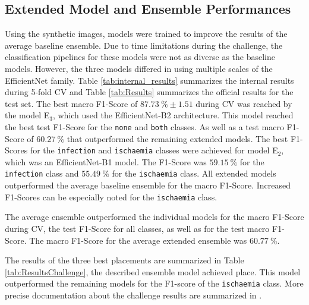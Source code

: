 \documentclass[runningheads]{llncs}
\begin{document}

\subsection{Extended Model and Ensemble Performances}%

Using the synthetic images, models were trained to improve the results of the average baseline ensemble. Due to time limitations during the challenge, the classification pipelines for these models were not as diverse as the baseline models. However, the three models differed in using multiple scales of the EfficientNet family. Table \ref{tab:internal_results} summarizes the internal results during 5-fold CV and Table \ref{tab:Results} summarizes the official results for the test set. The best macro F1-Score of $87.73~\% \pm1.51$ during CV was reached by the model E$_3$, which used the EfficientNet-B2 architecture. This model reached the best test F1-Score for the \texttt{none} and \texttt{both} classes. As well as a test macro F1-Score of $60.27~\%$ that outperformed the remaining extended models. The best F1-Scores for the \texttt{infection} and \texttt{ischaemia} classes were achieved for model E$_2$, which was an EfficientNet-B1 model. The F1-Score was $59.15~\%$ for the \texttt{infection} class and $55.49~\%$ for the \texttt{ischaemia} class. All extended models outperformed the average baseline ensemble for the macro F1-Score. Increased F1-Scores can be especially noted for the \texttt{ischaemia} class.

The average ensemble outperformed the individual models for the macro F1-Score during CV, the test F1-Score for all classes, as well as for the test macro F1-Score. The macro F1-Score for the average extended ensemble was $60.77~\%$. 

The results of the three best placements are summarized in Table \ref{tab:ResultsChallenge}, the described ensemble model achieved  place. This model outperformed the remaining models for the F1-score of the \texttt{ischaemia} class. More precise documentation about the challenge results are summarized in \cite{cassidy2021diabetic}.
\end{document}
